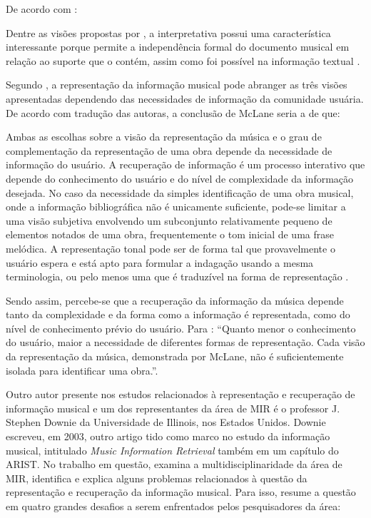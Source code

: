 De acordo com :

\begin{citacao}
Dentre as visões propostas por , a interpretativa possui uma característica interessante porque permite a independência formal do documento musical em relação ao suporte que o contém, assim como foi possível na informação textual \cite{cruz2014}.
\end{citacao}

Segundo , a representação da informação musical pode abranger as três visões apresentadas dependendo das necessidades de informação da comunidade usuária. De acordo com tradução das autoras, a conclusão de McLane seria a de que:

\begin{citacao}
Ambas as escolhas sobre a visão da representação da música e o grau de complementação da representação de uma obra depende da necessidade de informação do usuário. A recuperação de informação é um processo interativo que depende do conhecimento do usuário e do nível de complexidade da informação desejada. No caso da necessidade da simples identificação de uma obra musical, onde a informação bibliográfica não é unicamente suficiente, pode-se limitar a uma visão subjetiva envolvendo um subconjunto relativamente pequeno de elementos notados de uma obra, frequentemente o tom inicial de uma frase melódica. A representação tonal pode ser de forma tal que provavelmente o usuário espera e está apto para formular a indagação usando a mesma terminologia, ou pelo menos uma que é traduzível na forma de representação .
\end{citacao}

Sendo assim, percebe-se que a recuperação da informação da música depende tanto da complexidade e da forma como a informação é representada, como do nível de conhecimento prévio do usuário. Para : “Quanto menor o conhecimento do usuário, maior a necessidade de diferentes formas de representação. Cada visão da representação da música, demonstrada por McLane, não é suficientemente isolada para identificar uma obra.”.

Outro autor presente nos estudos relacionados à representação e recuperação de informação musical e um dos representantes da área de MIR é o professor J. Stephen Downie da Universidade de Illinois, nos Estados Unidos. Downie escreveu, em 2003, outro artigo tido como marco no estudo da informação musical, intitulado \textit{Music Information Retrieval} também em um capítulo do ARIST. No trabalho em questão,  examina a multidisciplinaridade da área de MIR, identifica e explica alguns problemas relacionados à questão da representação e recuperação da informação musical. Para isso,  resume a questão em quatro grandes desafios a serem enfrentados pelos pesquisadores da área:

